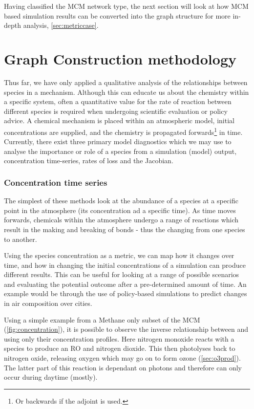 Having classified the MCM network type, the next section will look at how MCM based simulation results can be converted into the graph structure for more in-depth analysis, \autoref{sec:metriccase}.


\section{Graph Construction methodology }\label{sec:chem}

Thus far, we have only applied a qualitative analysis of the relationships between species in a mechanism. Although this can educate us about the chemistry within a specific system, often a quantitative value for the rate of reaction between different species is required when undergoing scientific evaluation or policy advice. A chemical mechanism is placed within an atmospheric model, initial concentrations are supplied, and the chemistry is propagated forwards\footnote{Or backwards if the adjoint is used.} in time. Currently, there exist three primary model diagnostics which we may use to analyse the importance or role of a species from a simulation (model) output, concentration time-series, rates of loss and the Jacobian.


\subsubsection{Concentration time series}

The simplest of these methods look at the abundance of a  species at a specific point in the atmosphere (its concentration ad a specific time). As time moves forwards, chemicals within the atmosphere undergo a range of reactions which result in the making and breaking of bonds - thus the changing from one species to another. 

Using the species concentration as a metric, we can map how it changes over time, and how in changing the initial concentrations of a simulation can produce different results. This can be useful for looking at a range of possible scenarios and evaluating the potential outcome after a pre-determined amount of time. An example would be through the use of policy-based simulations to predict changes in air composition over cities.

Using a simple example from a Methane only subset of the MCM (\autoref{fig:concentration}), it is possible to observe the inverse relationship between  and  using only their concentration profiles. Here nitrogen monoxide reacts with a  species to produce an RO and nitrogen dioxide.
This then photolyses back to nitrogen oxide, releasing oxygen which may go on to form ozone (\autoref{sec:o3prod}). The latter part of this reaction is dependant on photons and therefore can only occur during daytime (mostly).
 
